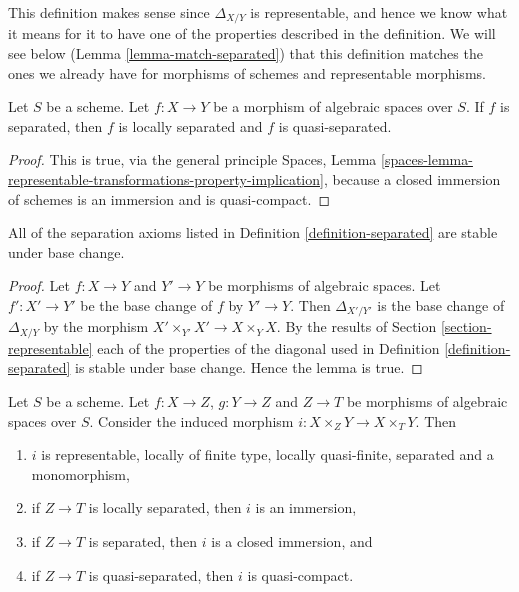\noindent
This definition makes sense since $\Delta_{X/Y}$ is representable,
and hence we know what it means for it to have one of the properties
described in the definition. We will see below
(Lemma \ref{lemma-match-separated}) that this definition matches the ones
we already have for morphisms of schemes and representable morphisms.

\begin{lemma}
\label{lemma-trivial-implications}
Let $S$ be a scheme. Let $f : X \to Y$ be a morphism of algebraic spaces
over $S$. If $f$ is separated, then $f$ is locally separated and
$f$ is quasi-separated.
\end{lemma}

\begin{proof}
This is true, via the general principle
Spaces,
Lemma \ref{spaces-lemma-representable-transformations-property-implication},
because a closed immersion of schemes is an immersion and is quasi-compact.
\end{proof}

\begin{lemma}
\label{lemma-base-change-separated}
All of the separation axioms listed in Definition \ref{definition-separated}
are stable under base change.
\end{lemma}

\begin{proof}
Let $f : X \to Y$ and $Y' \to Y$ be morphisms of algebraic spaces.
Let $f' : X' \to Y'$ be the base change of $f$ by $Y' \to Y$. Then
$\Delta_{X'/Y'}$ is the base change of $\Delta_{X/Y}$ by
the morphism $X' \times_{Y'} X' \to X \times_Y X$. By the results of
Section \ref{section-representable}
each of the properties of the diagonal used in
Definition \ref{definition-separated}
is stable under base change. Hence the lemma is true.
\end{proof}

\begin{lemma}
\label{lemma-fibre-product-after-map}
Let $S$ be a scheme. Let $f : X \to Z$, $g : Y \to Z$ and $Z \to T$
be morphisms of algebraic spaces over $S$. Consider the induced morphism
$i : X \times_Z Y \to X \times_T Y$. Then
\begin{enumerate}
\item $i$ is representable, locally of finite type, locally quasi-finite,
separated and a monomorphism,
\item if $Z \to T$ is locally separated, then $i$ is an immersion,
\item if $Z \to T$ is separated, then $i$ is a closed immersion, and
\item if $Z \to T$ is quasi-separated, then $i$ is quasi-compact.
\end{enumerate}
\end{lemma}

